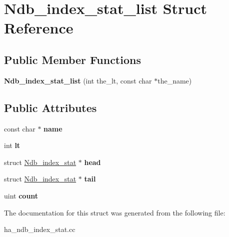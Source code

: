 \hypertarget{structNdb__index__stat__list}{}\section{Ndb\+\_\+index\+\_\+stat\+\_\+list Struct Reference}
\label{structNdb__index__stat__list}
\subsection*{Public Member Functions}
\begin{DoxyCompactItemize}
\item 
\mbox{\label{structNdb__index__stat__list_afd35b9cfa09862eab919fa09182cda29}} 
{\bfseries Ndb\+\_\+index\+\_\+stat\+\_\+list} (int the\+\_\+lt, const char $\ast$the\+\_\+name)
\end{DoxyCompactItemize}
\subsection*{Public Attributes}
\begin{DoxyCompactItemize}
\item 
\mbox{\label{structNdb__index__stat__list_a4469038d2d91847dde61d9e9f3ddf7e4}} 
const char $\ast$ {\bfseries name}
\item 
\mbox{\label{structNdb__index__stat__list_a7f87a4115797f840d6f55d4c11d4a678}} 
int {\bfseries lt}
\item 
\mbox{\label{structNdb__index__stat__list_a1d4125c021be72739dafc9d91f3cb701}} 
struct \mbox{\hyperlink{structNdb__index__stat}{Ndb\+\_\+index\+\_\+stat}} $\ast$ {\bfseries head}
\item 
\mbox{\label{structNdb__index__stat__list_a5277969130f541f3e2c8267a4f4b2027}} 
struct \mbox{\hyperlink{structNdb__index__stat}{Ndb\+\_\+index\+\_\+stat}} $\ast$ {\bfseries tail}
\item 
\mbox{\label{structNdb__index__stat__list_a9ffd448511910e037b01acf3c6b21018}} 
uint {\bfseries count}
\end{DoxyCompactItemize}


The documentation for this struct was generated from the following file\+:\begin{DoxyCompactItemize}
\item 
ha\+\_\+ndb\+\_\+index\+\_\+stat.\+cc\end{DoxyCompactItemize}
